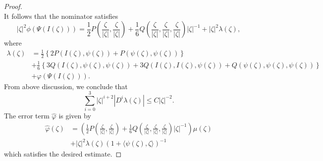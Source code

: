 \documentclass[11pt,letterpaper]{amsart}
\theoremstyle{definition}
\theoremstyle{remark}
\numberwithin{equation}{section}
\begin{document}
\begin{proof}
\begin{equation*}
\end{equation*}
It follows that the nominator satisfies
\begin{equation*}
    |\zeta|^2\phi(\Psi(I(\zeta)))=\frac{1}{2}P\left(\frac{\zeta}{|\zeta|},\frac{\zeta}{|\zeta|} \right)+\frac{1}{6}Q\left(\frac{\zeta}{|\zeta|},\frac{\zeta}{|\zeta|},\frac{\zeta}{|\zeta|} \right)|\zeta|^{-1}+|\zeta|^2\lambda(\zeta),
\end{equation*}
where
\begin{equation*}
\begin{split}
    \lambda(\zeta)&=\frac{1}{2}\left\{2P(I(\zeta), \psi(\zeta))+P(\psi(\zeta), \psi(\zeta))\right\}\\
    &+\frac{1}{6}\left\{3Q(I(\zeta), \psi(\zeta), \psi(\zeta))+3Q(I(\zeta), I(\zeta), \psi(\zeta))+Q(\psi(\zeta), \psi(\zeta), \psi(\zeta))\right\}\\
    &+\varphi(\Psi(I(\zeta))).
    \end{split}
\end{equation*}
From above discussion, we conclude that
\begin{equation*}
    \sum_{i=0}^{3} |\zeta|^{i+2}|D^{i}\lambda(\zeta)|\leq C|\zeta|^{-2}.
\end{equation*}
The error term $\hat{\varphi}$ is given by
\begin{equation*}
    \begin{split}
        \hat{\varphi}(\zeta)&=\left(\frac{1}{2}P\left(\frac{\zeta}{|\zeta|},\frac{\zeta}{|\zeta|} \right)+\frac{1}{6}Q\left(\frac{\zeta}{|\zeta|},\frac{\zeta}{|\zeta|},\frac{\zeta}{|\zeta|} \right)|\zeta|^{-1}\right)\mu(\zeta)\\
        &+|\zeta|^2\lambda(\zeta)\left(1+\langle \psi(\zeta), \zeta\rangle\right)^{-1}
    \end{split}
\end{equation*}
which satisfies the desired estimate.
\end{proof}
\end{document}
